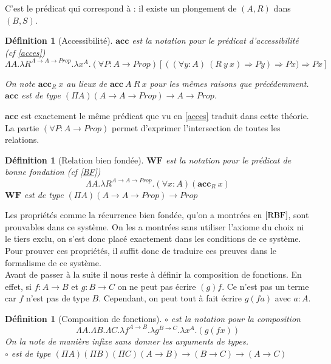 \documentclass[a4paper,12pt]{article}
\theoremstyle{plain}
\newtheorem{defi}[theo]{Définition}
\renewcommand{\implies}{\Rightarrow}
\begin{document}
C'est le prédicat qui correspond à : il existe un plongement de $(A,R)$ dans $(B,S)$.

\begin{defi}[Accessibilité]
$\mathbf{acc}$ est la notation pour le prédicat d'accessibilité (cf \ref{acces})
$$ \Lambda A. \lambda R^{A \to A \to \mathit{Prop}}. \lambda x^A.(\forall P : A \to \mathit{Prop})[( (\forall y : A) \ (R \ y \ x) \implies Py) \implies Px)\implies Px]$$


On note $\mathbf{acc}_R \ x$ au lieux de $\mathbf{acc}\ A \ R \ x$ pour les mêmes raisons que précédemment. $\mathbf{acc}$ est de type $(\Pi A)( A \to A \to \mathit{Prop}) \to A \to \mathit{Prop}$. 
\end{defi}

$\mathbf{acc}$ est exactement le même prédicat que vu en \ref{acces} traduit dans cette théorie. La partie $(\forall P : A \to \mathit{Prop})$ permet d'exprimer l'intersection de toutes les relations.

\begin{defi}[Relation bien fondée]
$\mathbf{WF}$ est la notation pour le prédicat de bonne fondation (cf \ref{BF})
$$ \Lambda A. \lambda R^{A \to A \to \mathit{Prop}}. (\forall x:A) (\mathbf{acc}_R \ x)$$
$\mathbf{WF}$ est de type $(\Pi A)( A \to A \to \mathit{Prop}) \to \mathit{Prop}$
\end{defi}

Les propriétés comme la récurrence bien fondée, qu'on a montrées en $\ref{RBF}$, sont prouvables dans ce système. On les a montrées sans utiliser l'axiome du choix ni le tiers exclu, on s'est donc placé exactement dans les conditions de ce système. Pour prouver ces propriétés, il suffit donc de traduire ces preuves dans le formalisme de ce système.\\

Avant de passer à la suite il nous reste à définir la composition de fonctions. En effet, si $f: A \to B$ et $g : B \to C$ on ne peut pas écrire $(g)f$. Ce n'est pas un terme car $f$ n'est pas de type $B$. Cependant, on peut tout à fait écrire $g(fa)$ avec $a : A$.

\begin{defi}[Composition de fonctions]
$\circ$ est la notation pour la composition
$$\Lambda A. \Lambda B. \Lambda C. \lambda f^{A \to B}. \lambda g^{B \to C}.\lambda x^A.(g(fx))$$
On la note de manière infixe sans donner les arguments de types.\\
 $\circ$ est de type $(\Pi A)(\Pi B)(\Pi C)(A\to B) \to (B \to C) \to (A \to C)$
\end{defi}
\end{document}
